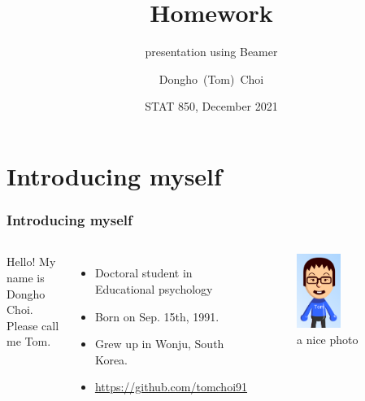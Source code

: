 \documentclass{beamer}
\title[Beamer sample] %
{Homework}
\subtitle{presentation using Beamer}
\author[Tom Choi] %
{Dongho~(Tom)~Choi\inst{1}}
\institute[UNL] %
{
  \inst{1}%
  PhD student\\
  Univesrity of Nebraska-Lincoln
}
\date[December 2021] %
{STAT 850, December 2021}
\begin{document}
\frame{\titlepage}



\section{Introducing myself}

\begin{frame}
\frametitle{Introducing myself}

\begin{columns}

Hello! My name is Dongho Choi.
\newline
Please call me Tom.
\newline
\begin{itemize}
\item Doctoral student in Educational psychology
\item Born on Sep. 15th, 1991.
\item Grew up in Wonju, South Korea.
\item \url{https://github.com/tomchoi91}
\end{itemize}

    \begin{figure}[h]
    \includegraphics[width=0.5\textwidth]{Picture2.png}
    \centering
    \caption{a nice photo}
    \label{fig:photo1}
    \end{figure}
\end{columns}
\end{frame}
\end{document}
